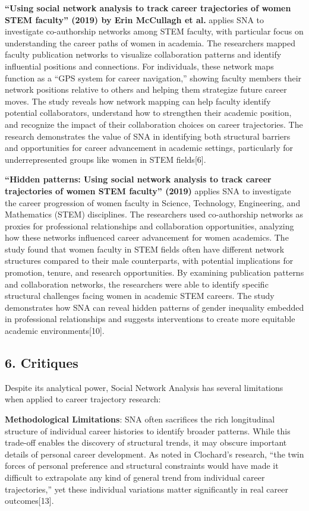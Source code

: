 \documentclass[
  letterpaper,
  DIV=11,
  numbers=noendperiod]{scrartcl}
\begin{document}
\textbf{``Using social network analysis to track career trajectories of
women STEM faculty'' (2019) by Erin McCullagh et al.} applies SNA to
investigate co-authorship networks among STEM faculty, with particular
focus on understanding the career paths of women in academia. The
researchers mapped faculty publication networks to visualize
collaboration patterns and identify influential positions and
connections. For individuals, these network maps function as a ``GPS
system for career navigation,'' showing faculty members their network
positions relative to others and helping them strategize future career
moves. The study reveals how network mapping can help faculty identify
potential collaborators, understand how to strengthen their academic
position, and recognize the impact of their collaboration choices on
career trajectories. The research demonstrates the value of SNA in
identifying both structural barriers and opportunities for career
advancement in academic settings, particularly for underrepresented
groups like women in STEM fields{[}6{]}.

\textbf{``Hidden patterns: Using social network analysis to track career
trajectories of women STEM faculty'' (2019)} applies SNA to investigate
the career progression of women faculty in Science, Technology,
Engineering, and Mathematics (STEM) disciplines. The researchers used
co-authorship networks as proxies for professional relationships and
collaboration opportunities, analyzing how these networks influenced
career advancement for women academics. The study found that women
faculty in STEM fields often have different network structures compared
to their male counterparts, with potential implications for promotion,
tenure, and research opportunities. By examining publication patterns
and collaboration networks, the researchers were able to identify
specific structural challenges facing women in academic STEM careers.
The study demonstrates how SNA can reveal hidden patterns of gender
inequality embedded in professional relationships and suggests
interventions to create more equitable academic environments{[}10{]}.

\subsection{6. Critiques}\label{critiques}

Despite its analytical power, Social Network Analysis has several
limitations when applied to career trajectory research:

\textbf{Methodological Limitations}: SNA often sacrifices the rich
longitudinal structure of individual career histories to identify
broader patterns. While this trade-off enables the discovery of
structural trends, it may obscure important details of personal career
development. As noted in Clochard's research, ``the twin forces of
personal preference and structural constraints would have made it
difficult to extrapolate any kind of general trend from individual
career trajectories,'' yet these individual variations matter
significantly in real career outcomes{[}13{]}.
\end{document}
